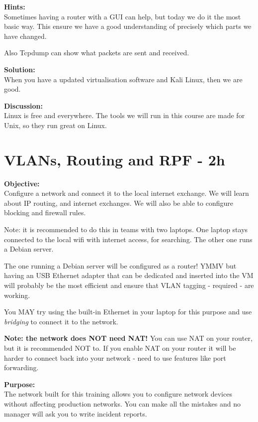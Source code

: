 \documentclass[a4paper,11pt,notitlepage]{report}
\begin{document}
{\bf Hints:}\\
Sometimes having a router with a GUI can help, but today we do it the most basic way. This ensure we have a good understanding of precisely which parts we have changed.

Also Tcpdump can show what packets are sent and received.

{\bf Solution:}\\
When you have a updated virtualisation software and Kali Linux, then we are good.

{\bf Discussion:}\\
Linux is free and everywhere. The tools we will run in this course are made for Unix, so they run great on Linux.



\chapter{VLANs, Routing and RPF - 2h}
\label{ex:vlans-routing-rpf}

{\bf Objective:}\\
Configure a network and connect it to the local internet exchange. We will learn about IP routing, and internet exchanges. We will also be able to configure blocking and firewall rules.

Note: it is recommended to do this in teams with two laptops. One laptop stays connected to the local wifi with internet access, for searching. The other one runs a Debian server.

The one running a Debian server will be configured as a router! YMMV but having an USB Ethernet adapter that can be dedicated and inserted into the VM will probably be the most efficient and ensure that VLAN tagging - required - are working.

You MAY try using the built-in Ethernet in your laptop for this purpose and use \emph{bridging} to connect it to the network.

{\bf Note: the network does NOT need NAT!} You can use NAT on your router, but it is recommended NOT to. If you enable NAT on your router it will be harder to connect back into your network - need to use features like port forwarding.

{\bf Purpose:}\\
The network built for this training allows you to configure network devices without affecting production networks. You can make all the mistakes and no manager will ask you to write incident reports.
\end{document}
